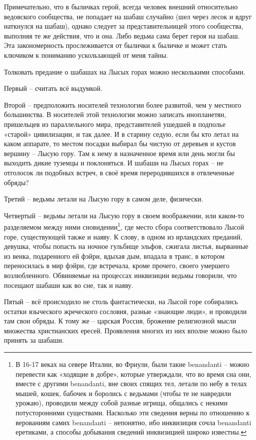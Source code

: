 Примечательно, что в быличках герой, всегда человек внешний относительно ведовского сообщества, не попадает на шабаш случайно (шел через лесок и вдруг наткнулся на шабаш), однако следует за представительницей этого сообщества, выполняя те же действия, что и она. Либо ведьма сама берет героя на шабаш. Эта закономерность прослеживается от былички к быличке и может стать ключиком к пониманию ускользающей от меня тайны.

Толковать предание о шабашах на Лысых горах можно несколькими способами.

Первый – считать всё выдумкой. 

Второй – предположить носителей технологии более развитой, чем у местного большинства. В носителей этой технологии можно записать инопланетян, пришельцев из параллельного мира, представителей ушедшей в подполье «старой» цивилизации, и так далее. И в старину седую, если бы кто летал на каком аппарате, то местом посадки выбирал бы чистую от деревьев и кустов вершину – Лысую гору. Там к нему в назначенное время или день могли бы выходить дикие туземцы и поклоняться. И шабаши на Лысых горах – не отголосок ли подобных встреч, в своё время переродившихся в отвлеченные обряды? 

Третий – ведьмы летали на Лысую гору в самом деле, физически.

Четвертый – ведьмы летали на Лысую гору в своем воображении, или каком-то разделяемом между ними сновидении\footnote{В 16-17 веках на севере Италии, во Фриули, были такие benandanti – можно перевести как «ходящие в добре», которые утверждали, что во время сна они, вместе с другими benandanti, вне своих спящих тел, летали по небу в телах мышей, кошек, бабочек и боролись с ведьмами (чтобы те не навредили урожаю), проводили между собой разные игрища, общались с некими потусторонними существами. Насколько эти сведения верны по отношению к верованиям самих benandanti – непонятно, ибо инквизиция сочла benandanti еретиками, а способы добывания сведений инквизицией широко известны.}, где место сбора соответствовало Лысой горе, существующей также и наяву. К слову, в одном из ирландских преданий, девушка, чтобы попасть на ночное гульбище эльфов, сжигала листья, вырванные из венка, подаренного ей фэйри,  вдыхая дым, впадала в транс, в котором переносилась в мир фэйри, где встречала, кроме прочего, своего умершего возлюбленного\cite{wilde01}. Обвиняемые на процессах инквизиции ведьмы говорили, что посещают шабаши как во сне, так и наяву.

Пятый – всё происходило не столь фантастически, на Лысой горе собирались остатки языческого жреческого сословия, разные «знающие люди», и проводили там свои обряды. К тому же – царская Россия, брожение религиозной мысли множества христианских ересей. Проявления многих из них вполне можно было принять за шабаши.

